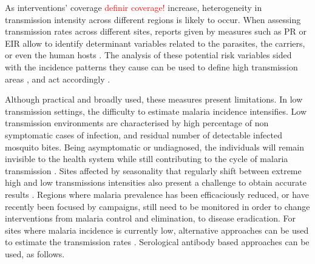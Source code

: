 As interventions' coverage \textcolor{red}{definir coverage!} increase, heterogeneity in transmission intensity across different regions is likely to occur.
When assessing transmission rates across different sites, reports given by measures such as PR or EIR allow to identify determinant variables related to the parasites, the carriers, or even the human hosts \cite{who2015guidelines}.
The analysis of these potential risk variables sided with the incidence patterns they cause can be used to define high transmission areas
, and act accordingly \cite{who2015guidelines,world2015global}.

Although practical and broadly used, these measures present limitations.
In low transmission settings, the difficulty to estimate malaria incidence intensifies.
Low transmission environments are characterised by high percentage of non symptomatic cases of infection, and residual number of detectable infected mosquito bites.
Being asymptomatic or undiagnosed, the individuals will remain invisible to the health system while still contributing to the cycle of malaria transmission \cite{world2015global}.
Sites affected by seasonality that regularly shift between extreme high and low transmissions intensities also present a challenge to obtain accurate results \cite{cameron2015defining,o2007parasite}.
Regions where malaria prevalence has been efficaciously reduced, or have recently been focused by campaigns, still need to be monitored in order to change interventions from malaria control and elimination, to disease eradication.
For sites where malaria incidence is currently low, alternative approaches can be used to estimate the transmission rates \cite{corran2007serology}. 
Serological antibody based approaches can be used, as follows.
